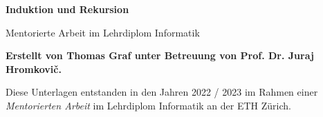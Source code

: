 \begin{titlepage}
    \thispagestyle{empty}
    \begin{center}
        \vspace*{1cm}
            
        {\Huge
        \textbf{Induktion und Rekursion}
            
        \vspace{0.5cm}
        \LARGE
        Mentorierte Arbeit im Lehrdiplom Informatik
            
        \vspace{1.5cm}
            
        \textbf{Erstellt von Thomas Graf unter Betreuung von Prof. Dr. Juraj Hromkovič.}
        }
        \vfill
        \clearpage
        \thispagestyle{empty}
        \mbox{}
        \vfill
        {\Large Diese Unterlagen entstanden in den Jahren 2022 / 2023 im Rahmen einer \textit{Mentorierten Arbeit} im Lehrdiplom Informatik an der ETH Zürich.}

        \vspace{0.8cm}
    \end{center}
\end{titlepage}
